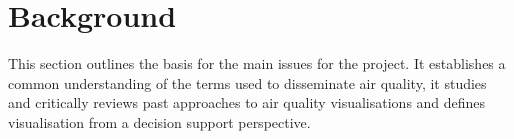 \chapter{Background}
This section outlines the basis for the main issues for the project. It establishes a common understanding of the terms used to disseminate air quality, it studies and critically reviews  past approaches to air quality visualisations and defines visualisation from a decision support perspective.






